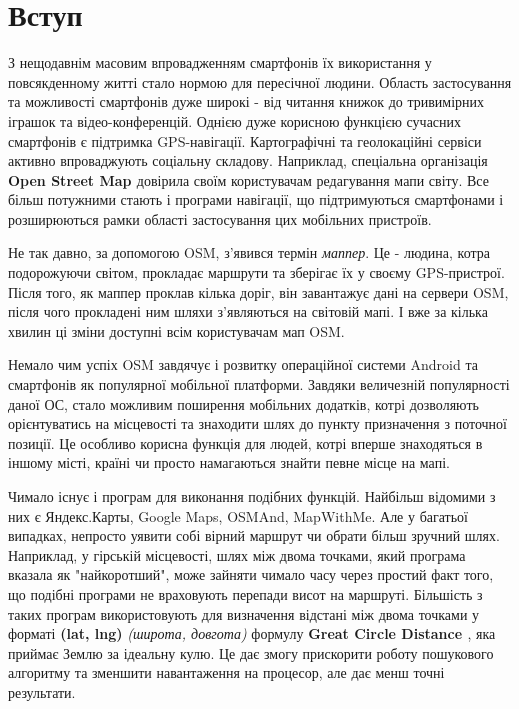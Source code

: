 \documentclass[simple,a4paper,14pt,ukrainian,utf8]{eskdtext}
\begin{document}
\tableofcontents

\newpage

  \clearpage \newpage
  
  \section*{Вступ}
	
    З нещодавнім масовим впровадженням смартфонів їх використання у повсякденному житті стало нормою для пересічної людини. Область застосування та можливості смартфонів дуже широкі - від читання книжок до тривимірних іграшок та відео-конференцій. Однією дуже корисною функцією сучасних смартфонів є підтримка GPS-навігації. Картографічні та геолокаційні сервіси активно впроваджують соціальну складову. Наприклад, спеціальна організація \textbf{Open Street Map \cite{website:osm}} довірила своїм користувачам редагування мапи світу. Все більш потужними стають і програми навігації, що підтримуються смартфонами і розширюються рамки області застосування цих мобільних пристроїв.

    Не так давно, за допомогою OSM, з’явився термін \textit{маппер}. Це - людина, котра подорожуючи світом, прокладає маршрути та зберігає їх у своєму GPS-пристрої. Після того, як маппер проклав кілька доріг, він завантажує дані на сервери OSM, після чого прокладені ним шляхи з’являються на світовій мапі. І вже за кілька хвилин ці зміни доступні всім користувачам мап OSM.
    
    Немало чим успіх OSM завдячує і розвитку операційної системи Android та смартфонів як популярної мобільної платформи. Завдяки величезній популярності даної ОС, стало можливим поширення мобільних додатків, котрі дозволяють орієнтуватись на місцевості та знаходити шлях до пункту призначення з поточної позиції. Це особливо корисна функція для людей, котрі вперше знаходяться в іншому місті, країні чи просто намагаються знайти певне місце на мапі.
    
    Чимало існує і програм для виконання подібних функцій. Найбільш відомими з них є Яндекс.Карты, Google Maps, OSMAnd, MapWithMe. Але у багатьої випадках, непросто уявити собі вірний маршрут чи обрати більш зручний шлях. Наприклад, у гірській місцевості, шлях між двома точками, який програма вказала як "найкоротший", може зайняти чимало часу через простий факт того, що подібні програми не враховують перепади висот на маршруті. Більшість з таких програм використовують для визначення відстані між двома точками у форматі \textbf{(lat, lng)} \textit{(широта, довгота)} формулу \textbf{Great Circle Distance \cite{website:great_circle_distance}}, яка приймає Землю за ідеальну кулю. Це дає змогу прискорити роботу пошукового алгоритму та зменшити навантаження на процесор, але дає менш точні результати.
    
\end{document}

